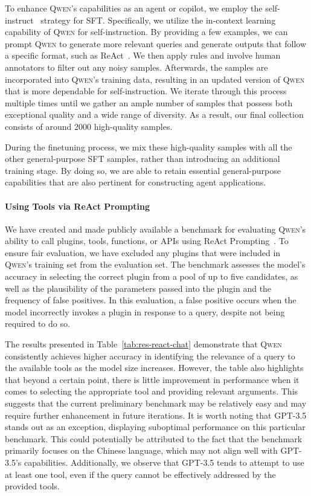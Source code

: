 To enhance \textsc{Qwen}'s capabilities as an agent or copilot, we employ the self-instruct~\citep{self_instruct} strategy for SFT. Specifically, we utilize the in-context learning capability of \textsc{Qwen} for self-instruction. By providing a few examples, we can prompt \textsc{Qwen} to generate more relevant queries and generate outputs that follow a specific format, such as ReAct~\citep{yao2022react}. We then apply rules and involve human annotators to filter out any noisy samples. Afterwards, the samples are incorporated into \textsc{Qwen}'s training data, resulting in an updated version of \textsc{Qwen} that is more dependable for self-instruction. We iterate through this process multiple times until we gather an ample number of samples that possess both exceptional quality and a wide range of diversity. As a result, our final collection consists of around \num{2000} high-quality samples. 

During the finetuning process, we mix these high-quality samples with all the other general-purpose SFT samples, rather than introducing an additional training stage. By doing so, we are able to retain essential general-purpose capabilities that are also pertinent for constructing agent applications.

\paragraph{Using Tools via ReAct Prompting}

We have created and made publicly available a benchmark for evaluating \textsc{Qwen}'s ability to call plugins, tools, functions, or APIs using ReAct Prompting~\citep[see][]{qwen-tool-eval}. 
To ensure fair evaluation, we have excluded any plugins that were included in \textsc{Qwen}'s training set from the evaluation set. The benchmark assesses the model's accuracy in selecting the correct plugin from a pool of up to five candidates, as well as the plausibility of the parameters passed into the plugin and the frequency of false positives. In this evaluation, a false positive occurs when the model incorrectly invokes a plugin in response to a query, despite not being required to do so.

The results presented in Table~\ref{tab:res-react-chat} demonstrate that \textsc{Qwen} consistently achieves higher accuracy in identifying the relevance of a query to the available tools as the model size increases. However, the table also highlights that beyond a certain point, there is little improvement in performance when it comes to selecting the appropriate tool and providing relevant arguments. This suggests that the current preliminary benchmark may be relatively easy and may require further enhancement in future iterations. It is worth noting that GPT-3.5 stands out as an exception, displaying suboptimal performance on this particular benchmark. This could potentially be attributed to the fact that the benchmark primarily focuses on the Chinese language, which may not align well with GPT-3.5's capabilities. Additionally, we observe that GPT-3.5 tends to attempt to use at least one tool, even if the query cannot be effectively addressed by the provided tools.

